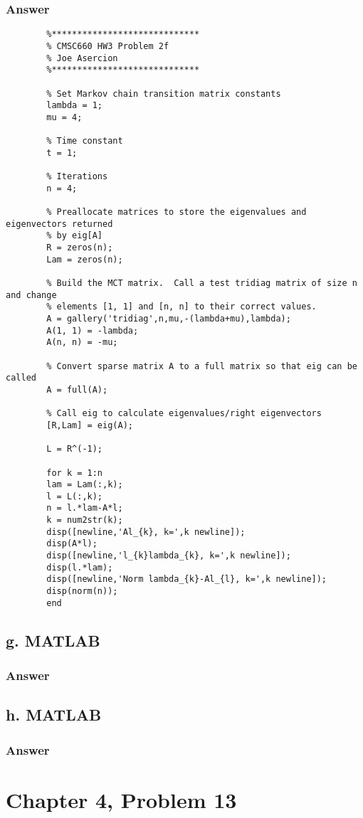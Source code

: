 \documentclass{article}
\begin{document}
		\subsubsection{Answer}
		\begin{lstlisting}
		%*****************************
		% CMSC660 HW3 Problem 2f
		% Joe Asercion
		%***************************** 
		
		% Set Markov chain transition matrix constants
		lambda = 1;
		mu = 4;
		
		% Time constant
		t = 1;
		
		% Iterations
		n = 4;
		
		% Preallocate matrices to store the eigenvalues and eigenvectors returned 
		% by eig[A]
		R = zeros(n);
		Lam = zeros(n);
		
		% Build the MCT matrix.  Call a test tridiag matrix of size n and change
		% elements [1, 1] and [n, n] to their correct values.
		A = gallery('tridiag',n,mu,-(lambda+mu),lambda);
		A(1, 1) = -lambda;
		A(n, n) = -mu;
		
		% Convert sparse matrix A to a full matrix so that eig can be called
		A = full(A);
		
		% Call eig to calculate eigenvalues/right eigenvectors
		[R,Lam] = eig(A);
		
		L = R^(-1);
		
		for k = 1:n
		lam = Lam(:,k);
		l = L(:,k);
		n = l.*lam-A*l;
		k = num2str(k);
		disp([newline,'Al_{k}, k=',k newline]);
		disp(A*l);
		disp([newline,'l_{k}lambda_{k}, k=',k newline]);
		disp(l.*lam);
		disp([newline,'Norm lambda_{k}-Al_{l}, k=',k newline]);
		disp(norm(n));
		end
		\end{lstlisting}
		\subsection{g. MATLAB}
		\subsubsection{Answer}
		
		\subsection{h. MATLAB}
		\subsubsection{Answer}
		
	\section{Chapter 4, Problem 13}
\end{document}
